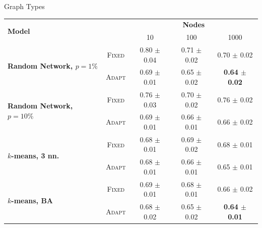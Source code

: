 \documentclass[aspectratio=169]{beamer}
\begin{document}
\begin{frame}{Graph Types}
    \centering
    \begin{tabular}{lcccc} \toprule
        \multirow{2}{*}{\textbf{Model}}                      &                            & \multicolumn{3}{c}{\textbf{Nodes}}                                                           \\ \cmidrule(lr){3-5}
                                                             &                            & 10                                 & 100                    & 1000                           \\ \hline
        \multirow{2}{*}{\textbf{Random Network, $p=1\%$} }   & \scriptsize \textsc{Fixed} & 0.80  \tiny $\pm$ 0.04             & 0.71  \tiny $\pm$ 0.02 & 0.70 \tiny $\pm$ 0.02          \\
                                                             & \scriptsize \textsc{Adapt} & 0.69 \tiny $\pm$ 0.01              & 0.65 \tiny $\pm$ 0.02  & \textbf{0.64 \tiny $\pm$ 0.02} \\
        \multirow{2}{*}{\textbf{Random Network, $p=10\%$}}   & \scriptsize \textsc{Fixed} & 0.76  \tiny $\pm$ 0.03             & 0.70  \tiny $\pm$ 0.02 & 0.76 \tiny $\pm$ 0.02          \\
                                                             & \scriptsize \textsc{Adapt} & 0.69 \tiny $\pm$ 0.01              & 0.66 \tiny $\pm$ 0.01  & 0.66 \tiny $\pm$ 0.02          \\
        \multirow{2}{*}{\textbf{$k$-means, 3 nn.}          } & \scriptsize \textsc{Fixed} & 0.68  \tiny $\pm$ 0.01             & 0.69  \tiny $\pm$ 0.02 & 0.68 \tiny $\pm$ 0.01          \\
                                                             & \scriptsize \textsc{Adapt} & 0.68 \tiny $\pm$ 0.01              & 0.66 \tiny $\pm$ 0.01  & 0.65 \tiny $\pm$ 0.01          \\
        \multirow{2}{*}{\textbf{$k$-means, BA}             } & \scriptsize \textsc{Fixed} & 0.69  \tiny $\pm$ 0.01             & 0.68  \tiny $\pm$ 0.01 & 0.66 \tiny $\pm$ 0.02          \\
                                                             & \scriptsize \textsc{Adapt} & 0.68 \tiny $\pm$ 0.02              & 0.65 \tiny $\pm$ 0.02  & \textbf{0.64 \tiny $\pm$ 0.01} \\

        \bottomrule
    \end{tabular}
\end{frame}
\end{document}
